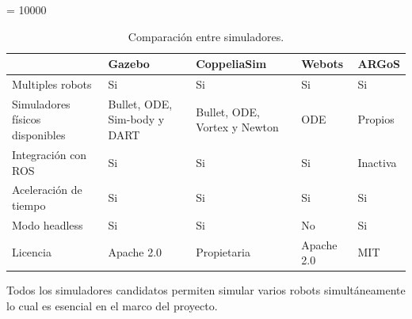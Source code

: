 \begin{table}[H]
\hbadness = 10000
\emergencystretch=10pt
\begin{center}
  \begin{tabularx}{\textwidth}{|X|X|X|X|X|}


\hline
                      & Gazebo                          & CoppeliaSim                      & Webots                          & ARGoS                               \\ \hline
Multiples robots      & \cellcolor{green!25}Si          & \cellcolor{green!25}Si           & \cellcolor{green!25}Si          & \cellcolor{green!25}Si              \\ \hline
Simuladores físicos disponibles &                                                                                                                                         
  \cellcolor{green!25}Bullet, ODE, Sim-body y DART  & 
  \cellcolor{green!25}Bullet, ODE, Vortex y Newton  &
  \cellcolor{green!25}ODE                           &
  \cellcolor{yellow!25} Propios                     \\ \hline
Integración con \gls{ROS}   & \cellcolor{green!25}Si          & \cellcolor{green!25}Si           & \cellcolor{green!25}Si          & \cellcolor{red!25}Inactiva \\ \hline 
Aceleración de tiempo & \cellcolor{green!25}Si          & \cellcolor{green!25}Si           & \cellcolor{green!25}Si          & \cellcolor{green!25}Si     \\ \hline
Modo headless         & \cellcolor{green!25}Si          & \cellcolor{green!25}Si           & \cellcolor{red!25}No            & \cellcolor{green!25}Si     \\ \hline
Licencia              & \cellcolor{green!25}Apache 2.0  & \cellcolor{yellow!25}Propietaria & \cellcolor{green!25}Apache 2.0  & \cellcolor{green!25}MIT    \\ \hline
  \end{tabularx}
  \caption{Comparación entre simuladores.}
  \label{tab:sims}
\end{center}

\end{table}

Todos los simuladores candidatos permiten simular varios robots simultáneamente
lo cual es esencial en el marco del proyecto. 

